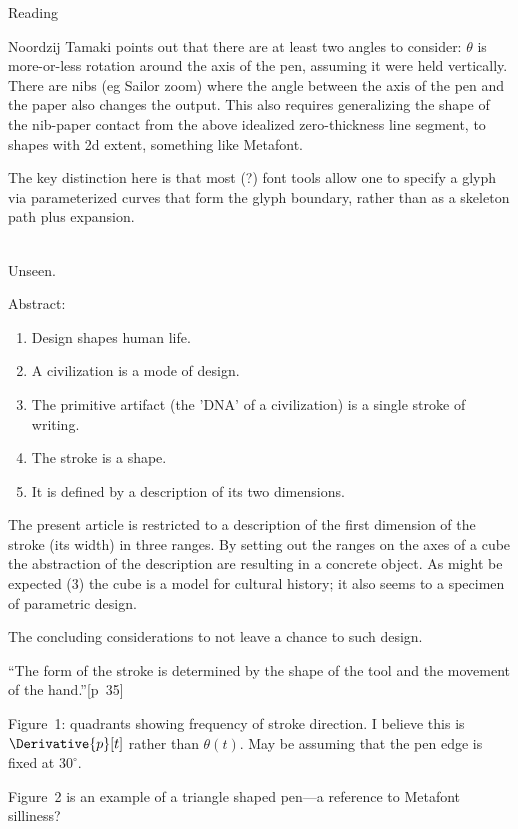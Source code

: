 \documentclass[11pt]{PalisadesLakesBook}
\begin{document}
\begin{plSection}{Reading}
\begin{plSection}{Noordzij}
Tamaki points out that there are at least two angles to consider:
$\theta$ is more-or-less rotation around the axis of the pen,
assuming it were held vertically.
There are nibs (eg Sailor zoom) 
where the angle between the axis of the pen and the paper
also changes the output.
This also requires generalizing the shape of the nib-paper contact
from the above idealized zero-thickness line segment,
to shapes with 2d extent, something like Metafont.

The key distinction here is that most (?) font tools
allow one to specify a glyph via parameterized curves that form
the glyph boundary, rather than as a skeleton path plus expansion.

\\
Unseen.

\begin{plQuote}{}{}
Abstract:
\begin{enumerate}
  \item Design shapes human life.
  \item A civilization is a mode of design.
  \item The primitive artifact (the 'DNA' of a civilization)
  is a single stroke of writing.
  \item The stroke is a shape.
  \item It is defined by a description of its two dimensions.
\end{enumerate}
The present article is restricted to a description of the first
dimension of the stroke (its width) in three ranges.
By setting out the ranges on the axes of a cube
the abstraction of the description are resulting 
in a concrete object.
As might be expected (3) the cube is a model for
cultural history;
it also seems to a specimen of parametric design.
\par
The concluding considerations to not leave a chance to such design.
\end{plQuote}%

``The form of the stroke is determined by the shape of the tool
and the movement of the hand.''[p~35]

Figure~1: quadrants showing frequency of stroke direction.
I believe this is $\Derivative{p}[t]$ rather than $\theta(t)$.
May be  assuming that the pen edge is fixed at
$30^{\circ}$.

Figure~2 is an example of a triangle shaped pen---a reference to
Metafont silliness?


\end{plSection}
\end{plSection}
\end{document}
